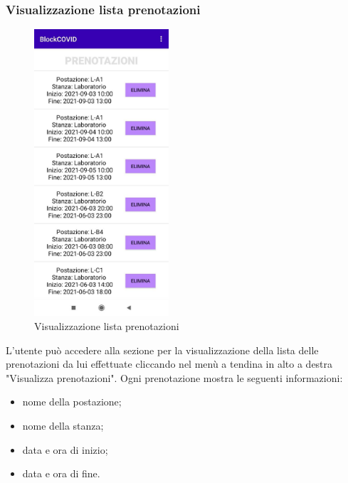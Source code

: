 	\subsubsection{Visualizzazione lista prenotazioni}
	\begin{figure}[H]
		\centering
		\includegraphics[width=5cm]{res/images/listaPrenotazioni.png}
		\caption{Visualizzazione lista prenotazioni}
	\end{figure}
	L’utente può accedere alla sezione per la visualizzazione della lista delle prenotazioni da lui effettuate cliccando nel menù a tendina in alto a destra "Visualizza prenotazioni".
	Ogni prenotazione mostra le seguenti informazioni:
	\begin{itemize}
		\item nome della postazione;
		\item nome della stanza;
		\item data e ora di inizio;
		\item data e ora di fine.
	\end{itemize}
